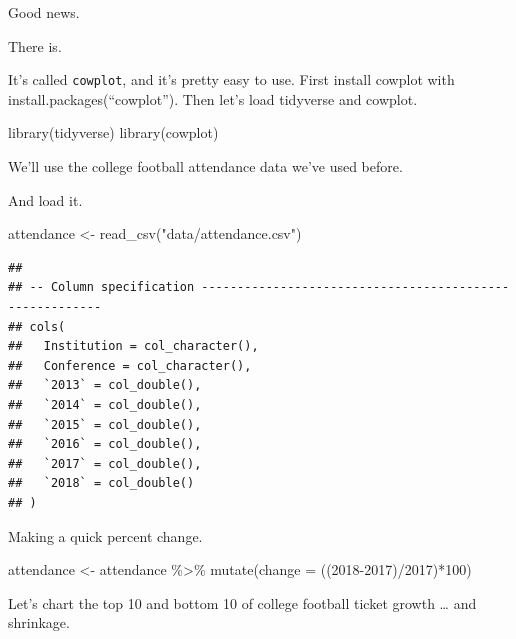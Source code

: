 \documentclass[
]{book}
\newenvironment{Shaded}{\begin{snugshade}}{\end{snugshade}}
\newcommand{\AttributeTok}[1]{\textcolor[rgb]{0.77,0.63,0.00}{#1}}
\newcommand{\DecValTok}[1]{\textcolor[rgb]{0.00,0.00,0.81}{#1}}
\newcommand{\FunctionTok}[1]{\textcolor[rgb]{0.00,0.00,0.00}{#1}}
\newcommand{\NormalTok}[1]{#1}
\newcommand{\OtherTok}[1]{\textcolor[rgb]{0.56,0.35,0.01}{#1}}
\newcommand{\SpecialCharTok}[1]{\textcolor[rgb]{0.00,0.00,0.00}{#1}}
\newcommand{\StringTok}[1]{\textcolor[rgb]{0.31,0.60,0.02}{#1}}
\begin{document}
Good news.

There is.

It's called \texttt{cowplot}, and it's pretty easy to use. First install cowplot with install.packages(``cowplot''). Then let's load tidyverse and cowplot.

\begin{Shaded}
\begin{Highlighting}[]
\FunctionTok{library}\NormalTok{(tidyverse)}
\FunctionTok{library}\NormalTok{(cowplot)}
\end{Highlighting}
\end{Shaded}

We'll use the college football attendance data we've used before.

And load it.

\begin{Shaded}
\begin{Highlighting}[]
\NormalTok{attendance }\OtherTok{\textless{}{-}} \FunctionTok{read\_csv}\NormalTok{(}\StringTok{"data/attendance.csv"}\NormalTok{)}
\end{Highlighting}
\end{Shaded}

\begin{verbatim}
## 
## -- Column specification --------------------------------------------------------
## cols(
##   Institution = col_character(),
##   Conference = col_character(),
##   `2013` = col_double(),
##   `2014` = col_double(),
##   `2015` = col_double(),
##   `2016` = col_double(),
##   `2017` = col_double(),
##   `2018` = col_double()
## )
\end{verbatim}

Making a quick percent change.

\begin{Shaded}
\begin{Highlighting}[]
\NormalTok{attendance }\OtherTok{\textless{}{-}}\NormalTok{ attendance }\SpecialCharTok{\%\textgreater{}\%} \FunctionTok{mutate}\NormalTok{(}\AttributeTok{change =}\NormalTok{ ((}\StringTok{\textasciigrave{}}\AttributeTok{2018}\StringTok{\textasciigrave{}}\SpecialCharTok{{-}}\StringTok{\textasciigrave{}}\AttributeTok{2017}\StringTok{\textasciigrave{}}\NormalTok{)}\SpecialCharTok{/}\StringTok{\textasciigrave{}}\AttributeTok{2017}\StringTok{\textasciigrave{}}\NormalTok{)}\SpecialCharTok{*}\DecValTok{100}\NormalTok{)}
\end{Highlighting}
\end{Shaded}

Let's chart the top 10 and bottom 10 of college football ticket growth \ldots{} and shrinkage.
\end{document}
